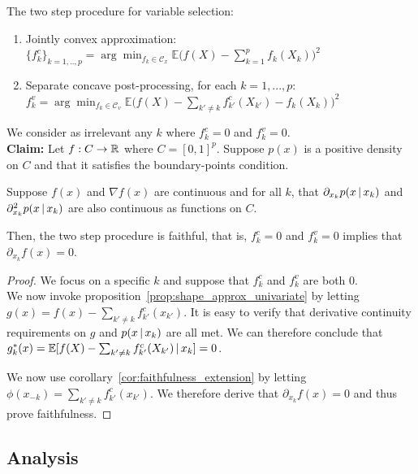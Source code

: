 \documentclass{article}
\begin{document}
{The two step procedure for variable selection:

\begin{enumerate}
\item Jointly convex approximation:\\ $\{f^c_k\}_{k=1,..,p} = \arg\min_{f_k \in \mathcal{C}_x} \mathbb{E}\Big( f(X) - \sum_{k=1}^p f_k(X_k) \Big)^2$
\item Separate concave post-processing, for each $k=1,...,p$: \\
$f^v_k = \arg\min_{f_k \in \mathcal{C}_v} 
    \mathbb{E}\Big( f(X) - \sum_{k' \neq k} f^c_{k'}(X_{k'}) - f_k(X_k) \Big)^2$
\end{enumerate}

We consider as irrelevant any $k$ where $f^c_k = 0$ and $f^v_k = 0$.\\

\textbf{Claim:} Let $f : C \rightarrow \mathbb{R}$ where $C = [0,1]^p$. Suppose $p(x)$ is a positive density on $C$ and that it satisfies the boundary-points condition.

Suppose $f(x)$ and $\nabla f(x)$ are continuous and for all $k$, that $\partial_{x_k} p(x \,|\, x_k)$ and $\partial^2_{x_k} p(x \,|\, x_k)$ are also continuous as functions on $C$.


Then, the two step procedure is faithful, that is, $f^c_k = 0$ and $f^v_k =0$ implies that $\partial_{x_k} f(x) = 0$.\\

\begin{proof}
We focus on a specific $k$ and suppose that $f^c_k$ and $f^v_k$ are both $0$.\\

We now invoke proposition~\ref{prop:shape_approx_univariate} by letting $g(x) = f(x) - \sum_{k'\neq k} f^c_{k'}(x_{k'})$. It is easy to verify that derivative continuity requirements on $g$ and $p(x \,|\, x_k)$ are all met. We can therefore conclude that $g^*_k(x) = \mathbb{E}[ f(X) - \sum_{k'\neq k} f^c_{k'}(X_{k'}) \,|\, x_k] = 0$.

We now use corollary~\ref{cor:faithfulness_extension} by letting $\phi(x_{-k}) = \sum_{k'\neq k} f^c_{k'}(x_{k'})$. We therefore derive that $\partial_{x_k} f(x) = 0$ and thus prove faithfulness.

\end{proof}

\subsection{Analysis}

}
\end{document}
